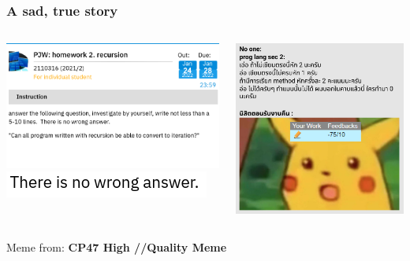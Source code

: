 \documentclass[aspectratio=169]{beamer}
\begin{document}
\begin{frame}
    \frametitle{A sad, true story}
    \pause
    \begin{columns}
        \begin{column}{0.4\textwidth}
            \centering
            \includegraphics[scale=0.3]{proglangsec1}
            \includegraphics[scale=0.5]{proglangsec1_nowrong}
        \end{column}
        \pause
        \begin{column}{0.4\textwidth}
            \centering
            \includegraphics[scale=0.2]{proglangsec2}
        \end{column}
    \end{columns}
    \begin{flushright}
        \tiny{Meme from: \textbf{CP47 High //Quality Meme}}
    \end{flushright}
\end{frame}
\end{document}
